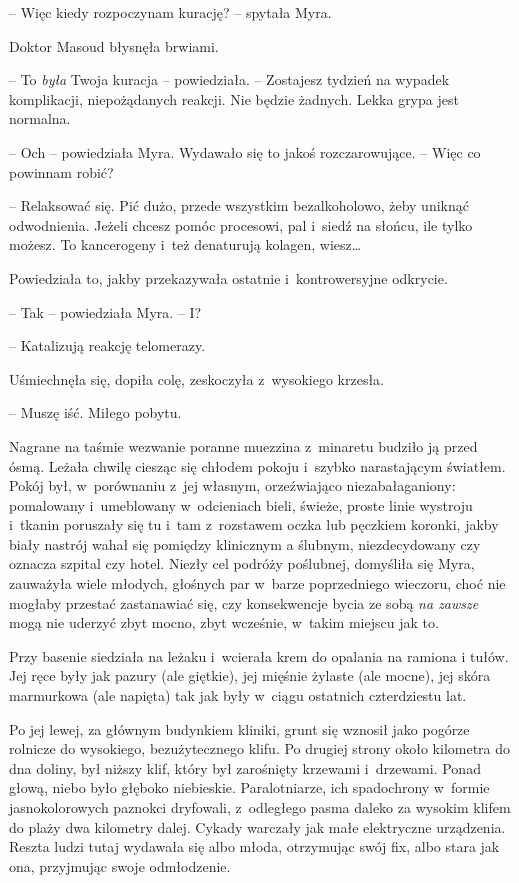 \documentclass[oneside,polish,11pt,sfheadings]{mwbk}
\begin{document}
-- Więc kiedy rozpoczynam kurację? -- spytała Myra.

Doktor Masoud błysnęła brwiami. 

-- To \textit{była} Twoja kuracja -- powiedziała. -- Zostajesz tydzień na wypadek komplikacji, niepożądanych
reakcji. Nie będzie żadnych. Lekka grypa jest normalna.

-- Och -- powiedziała Myra. Wydawało się to jakoś rozczarowujące. -- Więc
co powinnam robić?

-- Relaksować się. Pić dużo, przede wszystkim bezalkoholowo, żeby uniknąć
odwodnienia. Jeżeli chcesz pomóc procesowi, pal i~siedź na słońcu, ile
tylko możesz. To kancerogeny i~też denaturują kolagen, wiesz\ldots

Powiedziała to, jakby przekazywała ostatnie i~kontrowersyjne odkrycie.

-- Tak -- powiedziała Myra. -- I?

-- Katalizują reakcję telomerazy.

Uśmiechnęła się, dopiła colę, zeskoczyła z~wysokiego krzesła. 

-- Muszę iść. Miłego pobytu.

Nagrane na taśmie wezwanie poranne muezzina z~minaretu budziło ją przed
ósmą. Leżała chwilę ciesząc się chłodem pokoju i~szybko narastającym
światłem. Pokój był, w~porównaniu z~jej własnym, orzeźwiająco
niezabałaganiony: pomalowany i~umeblowany w~odcieniach bieli, świeże,
proste linie wystroju i~tkanin poruszały się tu i~tam z~rozstawem oczka
lub pęczkiem koronki, jakby biały nastrój wahał się pomiędzy klinicznym
a ślubnym, niezdecydowany czy oznacza szpital czy hotel. Niezły cel
podróży poślubnej, domyśliła się Myra, zauważyła wiele młodych, głośnych
par w~barze poprzedniego wieczoru, choć nie mogłaby przestać zastanawiać
się, czy konsekwencje bycia ze sobą \textit{na zawsze} mogą nie uderzyć
zbyt mocno, zbyt wcześnie, w~takim miejscu jak to.

Przy basenie siedziała na leżaku i~wcierała krem do opalania na ramiona
i tułów. Jej ręce były jak pazury (ale giętkie), jej mięśnie żylaste
(ale mocne), jej skóra marmurkowa (ale napięta) tak jak były w~ciągu
ostatnich czterdziestu lat.

Po jej lewej, za głównym budynkiem kliniki, grunt się wznosił jako
pogórze rolnicze do wysokiego, bezużytecznego klifu. Po drugiej strony
około kilometra do dna doliny, był niższy klif, który był zarośnięty
krzewami i~drzewami. Ponad głową, niebo było głęboko niebieskie.
Paralotniarze, ich spadochrony w~formie jasnokolorowych paznokci
dryfowali, z~odległego pasma daleko za wysokim klifem do plaży dwa
kilometry dalej. Cykady warczały jak małe elektryczne urządzenia. Reszta
ludzi tutaj wydawała się albo młoda, otrzymując swój fix, albo stara jak
ona, przyjmując swoje odmłodzenie.
\end{document}

